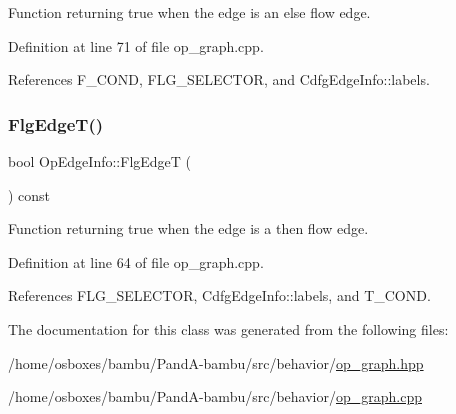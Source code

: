 Function returning true when the edge is an else flow edge. 



Definition at line 71 of file op\+\_\+graph.\+cpp.



References F\+\_\+\+C\+O\+ND, F\+L\+G\+\_\+\+S\+E\+L\+E\+C\+T\+OR, and Cdfg\+Edge\+Info\+::labels.

\mbox{\label{classOpEdgeInfo_a7409f855a6f551d2b520f79ad07a3e30}} 
\subsubsection{\texorpdfstring{Flg\+Edge\+T()}{FlgEdgeT()}}
{\footnotesize\ttfamily bool Op\+Edge\+Info\+::\+Flg\+EdgeT (\begin{DoxyParamCaption}{ }\end{DoxyParamCaption}) const}



Function returning true when the edge is a then flow edge. 



Definition at line 64 of file op\+\_\+graph.\+cpp.



References F\+L\+G\+\_\+\+S\+E\+L\+E\+C\+T\+OR, Cdfg\+Edge\+Info\+::labels, and T\+\_\+\+C\+O\+ND.



The documentation for this class was generated from the following files\+:\begin{DoxyCompactItemize}
\item 
/home/osboxes/bambu/\+Pand\+A-\/bambu/src/behavior/\hyperlink{op__graph_8hpp}{op\+\_\+graph.\+hpp}\item 
/home/osboxes/bambu/\+Pand\+A-\/bambu/src/behavior/\hyperlink{op__graph_8cpp}{op\+\_\+graph.\+cpp}\end{DoxyCompactItemize}
